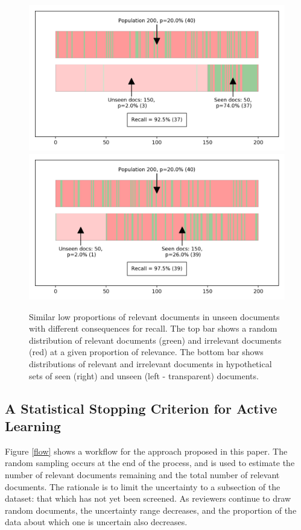 \documentclass{bmcart}
\begin{document}
\begin{figure}
	\includegraphics[width=\linewidth]{../images/proportions_1.png}
	\includegraphics[width=\linewidth]{../images/proportions_2.png}
	\caption{Similar low proportions of relevant documents in unseen documents with different consequences for recall. The top bar shows a random distribution of relevant documents (green) and irrelevant documents (red) at a given proportion of relevance. The bottom bar  shows distributions of relevant and irrelevant documents in hypothetical sets of seen (right) and unseen (left - transparent) documents.}
	\label{unseen-proportions}
\end{figure}



\subsection*{A Statistical Stopping Criterion for Active Learning}
	Figure \ref{flow} shows a workflow for the approach proposed in this paper. The random sampling occurs at the end of the process, and is used to estimate the number of relevant documents remaining and the total number of relevant documents. The rationale is to limit the uncertainty to a subsection of the dataset: that which has not yet been screened. As reviewers continue to draw random documents, the uncertainty range decreases, and the proportion of the data about which one is uncertain also decreases.
	
\end{document}
